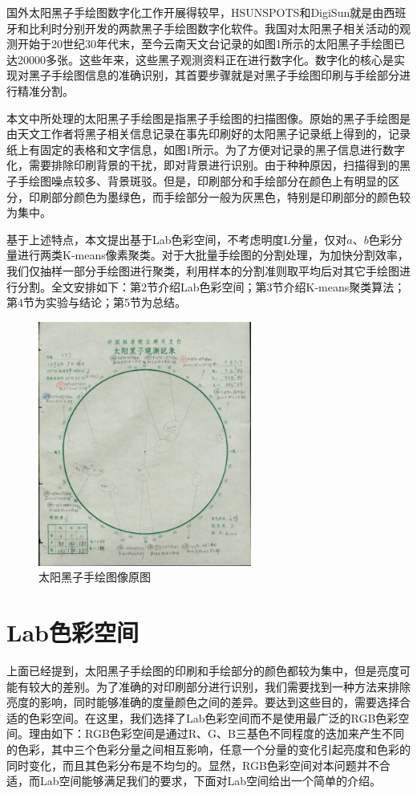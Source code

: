 \documentclass[UTF8,a4paper,twoside]{ctexart}
\begin{document}
国外太阳黑子手绘图数字化工作开展得较早，HSUNSPOTS和DigiSun就是由西班牙和比利时分别开发的两款黑子手绘图数字化软件。我国对太阳黑子相关活动的观测开始于20世纪30年代末，至今云南天文台记录的如图1所示的太阳黑子手绘图已达20000多张。这些年来，这些黑子观测资料正在进行数字化。数字化的核心是实现对黑子手绘图信息的准确识别，其首要步骤就是对黑子手绘图印刷与手绘部分进行精准分割。

本文中所处理的太阳黑子手绘图是指黑子手绘图的扫描图像。原始的黑子手绘图是由天文工作者将黑子相关信息记录在事先印刷好的太阳黑子记录纸上得到的，记录纸上有固定的表格和文字信息，如图1所示。为了方便对记录的黑子信息进行数字化，需要排除印刷背景的干扰，即对背景进行识别。由于种种原因，扫描得到的黑子手绘图噪点较多、背景斑驳。但是，印刷部分和手绘部分在颜色上有明显的区分，印刷部分颜色为墨绿色，而手绘部分一般为灰黑色，特别是印刷部分的颜色较为集中。

基于上述特点，本文提出基于Lab色彩空间，不考虑明度L分量，仅对$a$、$b$色彩分量进行两类K-means像素聚类。对于大批量手绘图的分割处理，为加快分割效率，我们仅抽样一部分手绘图进行聚类，利用样本的分割准则取平均后对其它手绘图进行分割。全文安排如下：第2节介绍Lab色彩空间；第3节介绍K-means聚类算法；第4节为实验与结论；第5节为总结。

\begin{figure}
  \centering
  \includegraphics[width=7cm]{fig01.png}
  \caption{太阳黑子手绘图像原图}
\end{figure}

\section{Lab色彩空间}
上面已经提到，太阳黑子手绘图的印刷和手绘部分的颜色都较为集中，但是亮度可能有较大的差别。为了准确的对印刷部分进行识别，我们需要找到一种方法来排除亮度的影响，同时能够准确的度量颜色之间的差异。要达到这些目的，需要选择合适的色彩空间。在这里，我们选择了Lab色彩空间而不是使用最广泛的RGB色彩空间。理由如下：RGB色彩空间是通过R、G、B三基色不同程度的迭加来产生不同的色彩，其中三个色彩分量之间相互影响，任意一个分量的变化引起亮度和色彩的同时变化，而且其色彩分布是不均匀的。显然，RGB色彩空间对本问题并不合适，而Lab空间能够满足我们的要求，下面对Lab空间给出一个简单的介绍。
\end{document}
